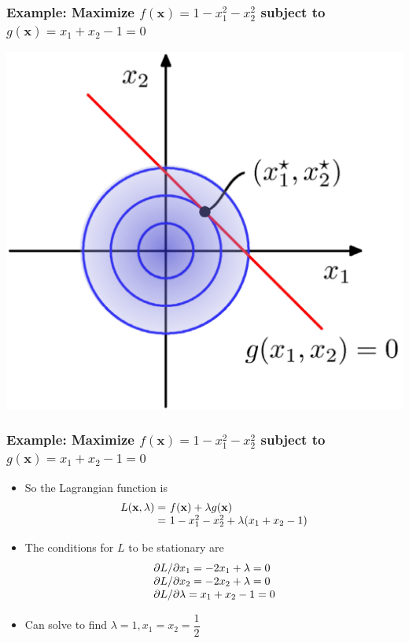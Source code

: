 \documentclass[12pt,notes,mathserif]{beamer}
\begin{document}
\begin{frame}[c]
	\frametitle{Example: Maximize $f(\mathbf{x})=1-x_1^2-x_2^2$ subject to $g(\mathbf{x})=x_1+x_2-1=0$}
	\begin{center}
		\includegraphics[width=0.65\linewidth]{fig8/lec830.jpg}
	\end{center}
\end{frame}


\begin{frame}[c]
	\frametitle{Example: Maximize $f(\mathbf{x})=1-x_1^2-x_2^2$ subject to $g(\mathbf{x})=x_1+x_2-1=0$}
	\begin{itemize}
		\item So the Lagrangian function is
		      \[
			      \begin{array}{r@{~}l}
				      L(\mathbf{x},\lambda)= & f(\mathbf{x})+\lambda g(\mathbf{x}) \\
				      =                      & 1-x_1^2-x_2^2+\lambda(x_1+x_2-1)
			      \end{array}
		      \]
		\item The conditions for $L$ to be stationary are
		      \[
			      \begin{array}{l@{~}l}
				      \partial L/\partial x_1=-2x_1+\lambda=0 \\
				      \partial L/\partial x_2=-2x_2+\lambda=0 \\
				      \partial L/\partial \lambda=x_1+x_2-1=0 \\
			      \end{array}
		      \]
		\item Can solve to find $\lambda=1,x_1=x_2=\dfrac{1}{2}$
	\end{itemize}
\end{frame}
\end{document}
